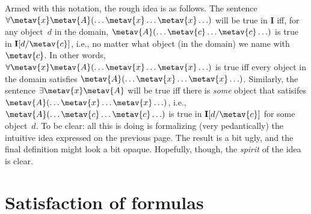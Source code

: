 Armed with this notation, the rough idea is as follows. The sentence
$\forall \metav{x}\metav{A}(\ldots \metav{x} \ldots \metav{x} \ldots)$
will be true in $\mathbf{I}$ iff, for any object~$d$ in the domain,
$\metav{A}(\ldots \metav{c} \ldots \metav{c}\ldots)$ is true in
$\mathbf{I}[d/\metav{c}]$, i.e., no matter what object (in the domain)
we name with $\metav{c}$. In other words, $\forall \metav{x}
\metav{A}(\ldots \metav{x} \ldots \metav{x} \ldots)$ is true iff every
object in the domain satisfies $\metav{A}(\ldots \metav{x} \ldots
\metav{x} \ldots)$. Similarly, the sentence $\exists
\metav{x}\metav{A}$ will be true iff there is \emph{some} object that
satisifes $\metav{A}(\ldots \metav{x} \ldots \metav{x} \ldots)$, i.e.,
$\metav{A}(\ldots \metav{c} \ldots \metav{c} \ldots)$ is true in
$\mathbf{I}[d/\metav{c}]$ for some object~$d$.
To be clear: all this is doing is formalizing (very pedantically) the intuitive idea expressed on the previous page. The result is a bit ugly, and the final definition might look a bit opaque. Hopefully, though, the \emph{spirit} of the idea is clear.

\section{Satisfaction of formulas}

